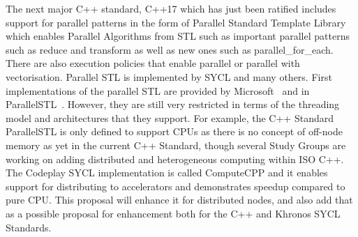 \documentclass[a4paper,11pt]{article}
\begin{document}
%
The next major C++ standard, C++17 which has just been ratified includes support for
parallel patterns in the form of Parallel Standard Template Library~\cite{parallelSTL} which enables Parallel Algorithms  from STL such as important parallel patterns such as reduce and transform as well as new ones such as parallel\_for\_each. There are also execution policies that enable parallel or parallel with vectorisation. 
Parallel STL is implemented by SYCL and many others. 
First implementations of the parallel STL are provided by Microsoft~\cite{CodePlexPSTL} 
and in ParallelSTL~\cite{ParallelSTLTLutz}. However, they are still very restricted
in terms of the threading model and architectures that they support. For example, the C++ Standard ParallelSTL is only defined to support CPUs as there is no concept of off-node memory as yet in the current C++ Standard, though several Study Groups are working on adding distributed and heterogeneous computing within ISO C++. The Codeplay SYCL implementation  is called ComputeCPP and it enables support for distributing to accelerators and demonstrates speedup compared to pure CPU. This proposal will enhance it for distributed nodes, and also add that as a possible proposal for enhancement both for the C++ and Khronos SYCL Standards.
\end{document}
